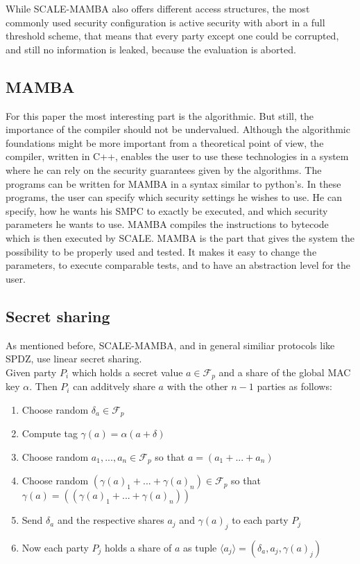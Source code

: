 \documentclass[english,runningheads,a4paper]{llncs}[2018/03/10]
\begin{document}
While SCALE-MAMBA also offers different access structures, the most commonly used security configuration is active security with abort in a full threshold scheme, that means that every party except one could be corrupted, and still no information is leaked, because the evaluation is aborted.

\subsection{MAMBA}
For this paper the most interesting part is the algorithmic. But still, the importance of the compiler should not be undervalued. Although the algorithmic foundations might be more important from a theoretical point of view, the compiler, written in C++, enables the user to use these technologies in a system where he can rely on the security guarantees given by the algorithms. The programs can be written for MAMBA in a syntax similar to python's. In these programs, the user can specify which security settings he wishes to use. He can specify, how he wants his SMPC to exactly be executed, and which security parameters he wants to use. MAMBA compiles the instructions to bytecode which is then executed by SCALE. MAMBA is the part that gives the system the possibility to be properly used and tested. It makes it easy to change the parameters, to execute comparable tests, and to have an abstraction level for the user.\\




\subsection{Secret sharing}
\label{sharing}

As mentioned before, SCALE-MAMBA, and in general similiar protocols like SPDZ, use linear secret sharing.\\
Given party \(P_i\) which holds a secret value \( a \in \mathcal{F}_p\) and a share of the global MAC key \( \alpha\). Then \( P_i\) can additvely share \( a\) with the other \(n-1\) parties as follows:
\begin{enumerate}
\item Choose random \(\delta_a \in \mathcal{F}_p\)
\item Compute tag $ \gamma (a)= \alpha(a+\delta)$
\item Choose random \(a_1,...,a_n \in \mathcal{F}_p\) so that $ a=(a_1+...+a_n)$
\item Choose random \((\gamma (a)_1+...+\gamma (a)_n) \in \mathcal{F}_p\) so that $\gamma (a)=((\gamma (a)_1+...+\gamma (a)_n))$
\item Send  \( \delta_a \) and the respective shares \(a_j \) and \( \gamma (a)_j \) to each party \( P_j \) 
\item Now each party \( P_j\) holds a share of \( a\) as tuple \(\langle a_j\rangle = (\delta_a,a_j,\gamma(a)_j )\)
\end{enumerate}
\end{document}
